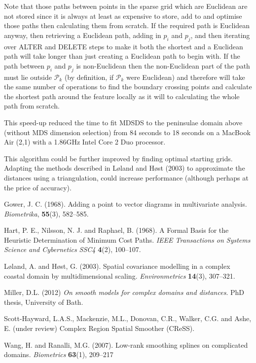 \documentclass{article}
\begin{document}
Note that those paths between points in the sparse grid which are Euclidean are not stored since it is always at least as expensive to store, add to and optimise those paths then calculating them from scratch. If the required path is Euclidean anyway, then retrieving a Euclidean path, adding in $p_i$ and $p_j$, and then iterating over ALTER and DELETE steps to make it both the shortest and a Euclidean path will take longer than just creating a Euclidean path to begin with. If the path between $p_i$ and $p_j$ is non-Euclidean then the non-Euclidean part of the path must lie outside $\mathcal{P}_k$ (by definition, if $\mathcal{P}_k$ were Euclidean) and therefore will take the same number of operations to find the boundary crossing points and calculate the shortest path around the feature locally as it will to calculating the whole path from scratch.

This speed-up reduced the time to fit MDSDS to the peninsulae domain above (without MDS dimension selection) from 84 seconds to 18 seconds on a MacBook Air (2,1) with a 1.86GHz Intel Core 2 Duo processor.

This algorithm could be further improved by finding optimal starting grids. Adapting the methods described in L{\o}land and H{\o}st (2003) to approximate the distances using a triangulation, could increase performance (although perhaps at the price of accuracy).


\begin{thebibliography}{99}

\bibitem{} Gower, J. C. (1968). Adding a point to vector diagrams in multivariate analysis. \textit{Biometrika}, \textbf{55}(3), 582--585.

\bibitem{} Hart, P. E., Nilsson, N. J. and Raphael, B. (1968). A Formal Basis for the Heuristic Determination of Minimum Cost Paths. \textit{IEEE Transactions on Systems Science and Cybernetics SSC4} \textbf{4}(2), 100--107.

\bibitem{} L{\o}land, A. and H{\o}st, G. (2003). Spatial covariance modelling in a complex coastal domain by multidimensional scaling. \textit{Environmetrics} \textbf{14}(3), 307--321.

\bibitem{} Miller, D.L. (2012) \textit{On smooth models for complex domains and distances}. PhD thesis, University of Bath.

\bibitem{} Scott-Hayward, L.A.S., Mackenzie, M.L., Donovan, C.R., Walker, C.G. and Ashe, E. (under review) Complex Region Spatial Smoother (CReSS).

\bibitem{} Wang, H. and Ranalli, M.G. (2007). Low-rank smoothing splines on complicated domains. \textit{Biometrics} \textbf{63}(1), 209--217

\end{thebibliography}
\end{document}
